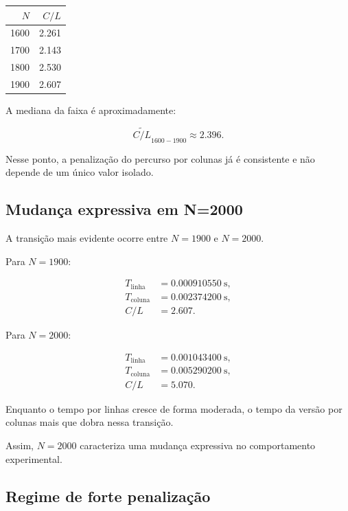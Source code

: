 \begin{center}
\begin{tabular}{rr}
\toprule
\(N\) & \(C/L\) \\
\midrule
1600 & 2.261 \\
1700 & 2.143 \\
1800 & 2.530 \\
1900 & 2.607 \\
\bottomrule
\end{tabular}
\end{center}

A mediana da faixa é aproximadamente:

\begin{equation}
    \widetilde{C/L}_{1600-1900}
    \approx
    2.396.
\end{equation}

Nesse ponto, a penalização do percurso por colunas já é consistente e
não depende de um único valor isolado.


\subsection{Mudança expressiva em N=2000}

A transição mais evidente ocorre entre \(N=1900\) e \(N=2000\).

Para \(N=1900\):

\begin{align}
T_{\mathrm{linha}}  &= 0.000910550\ \mathrm{s},\\
T_{\mathrm{coluna}} &= 0.002374200\ \mathrm{s},\\
C/L &= 2.607.
\end{align}

Para \(N=2000\):

\begin{align}
T_{\mathrm{linha}}  &= 0.001043400\ \mathrm{s},\\
T_{\mathrm{coluna}} &= 0.005290200\ \mathrm{s},\\
C/L &= 5.070.
\end{align}

Enquanto o tempo por linhas cresce de forma moderada, o tempo da versão
por colunas mais que dobra nessa transição.

Assim, \(N=2000\) caracteriza uma mudança expressiva no comportamento
experimental.


\subsection{Regime de forte penalização}

